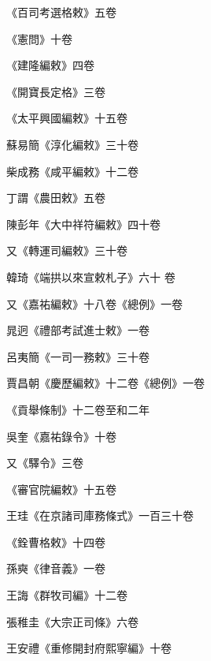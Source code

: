 \begin{pinyinscope}
 《百司考選格敕》五卷



 《憲問》十卷



 《建隆編敕》四卷



 《開寶長定格》三卷



 《太平興國編敕》十五卷



 蘇易簡《淳化編敕》三十卷



 柴成務《咸平編敕》十二卷



 丁謂《農田敕》五卷



 陳彭年《大中祥符編敕》四十卷



 又《轉運司編敕》三十卷



 韓琦《端拱以來宣敕札子》六十
 卷



 又《嘉祐編敕》十八卷《總例》一卷



 晁迥《禮部考試進士敕》一卷



 呂夷簡《一司一務敕》三十卷



 賈昌朝《慶歷編敕》十二卷《總例》一卷



 《貢舉條制》十二卷至和二年



 吳奎《嘉祐錄令》十卷



 又《驛令》三卷



 《審官院編敕》十五卷



 王珪《在京諸司庫務條式》一百三十卷



 《銓曹格敕》十四卷



 孫奭《律音義》一卷



 王誨《群牧司編》十二卷



 張稚圭《大宗正司條》六卷



 王安禮《重修開封府熙寧編》十卷




\end{pinyinscope}
